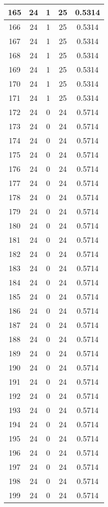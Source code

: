 \documentclass[letterpaper, 12pt]{article}
\begin{document}
\begin{longtable}{|c|c|c|c|c|}
\hline
165 & 24 & 1 & 25 & 0.5314 \\
\hline
166 & 24 & 1 & 25 & 0.5314 \\
\hline
167 & 24 & 1 & 25 & 0.5314 \\
\hline
168 & 24 & 1 & 25 & 0.5314 \\
\hline
169 & 24 & 1 & 25 & 0.5314 \\
\hline
170 & 24 & 1 & 25 & 0.5314 \\
\hline
171 & 24 & 1 & 25 & 0.5314 \\
\hline
172 & 24 & 0 & 24 & 0.5714 \\
\hline
173 & 24 & 0 & 24 & 0.5714 \\
\hline
174 & 24 & 0 & 24 & 0.5714 \\
\hline
175 & 24 & 0 & 24 & 0.5714 \\
\hline
176 & 24 & 0 & 24 & 0.5714 \\
\hline
177 & 24 & 0 & 24 & 0.5714 \\
\hline
178 & 24 & 0 & 24 & 0.5714 \\
\hline
179 & 24 & 0 & 24 & 0.5714 \\
\hline
180 & 24 & 0 & 24 & 0.5714 \\
\hline
181 & 24 & 0 & 24 & 0.5714 \\
\hline
182 & 24 & 0 & 24 & 0.5714 \\
\hline
183 & 24 & 0 & 24 & 0.5714 \\
\hline
184 & 24 & 0 & 24 & 0.5714 \\
\hline
185 & 24 & 0 & 24 & 0.5714 \\
\hline
186 & 24 & 0 & 24 & 0.5714 \\
\hline
187 & 24 & 0 & 24 & 0.5714 \\
\hline
188 & 24 & 0 & 24 & 0.5714 \\
\hline
189 & 24 & 0 & 24 & 0.5714 \\
\hline
190 & 24 & 0 & 24 & 0.5714 \\
\hline
191 & 24 & 0 & 24 & 0.5714 \\
\hline
192 & 24 & 0 & 24 & 0.5714 \\
\hline
193 & 24 & 0 & 24 & 0.5714 \\
\hline
194 & 24 & 0 & 24 & 0.5714 \\
\hline
195 & 24 & 0 & 24 & 0.5714 \\
\hline
196 & 24 & 0 & 24 & 0.5714 \\
\hline
197 & 24 & 0 & 24 & 0.5714 \\
\hline
198 & 24 & 0 & 24 & 0.5714 \\
\hline
199 & 24 & 0 & 24 & 0.5714 \\
\hline
\end{longtable}
\end{document}
